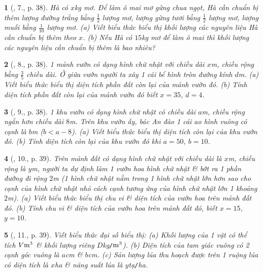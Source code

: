 \documentclass{article}
\newtheorem{baitoan}{}
\begin{document}
\begin{baitoan}[\cite{SBT_Toan_7_Canh_Dieu_tap_2}, 7., p. 38]
	Hà có $x$\emph{kg} mơ. Để làm ô mai mơ gừng chua ngọt, Hà cần chuẩn bị thêm lượng đường trắng bằng $\frac{1}{2}$ lượng mơ, lượng gừng tươi bằng $\frac{1}{2}$ lượng mơ, lượng muối bằng $\frac{1}{10}$ lượng mơ. (a) Viết biểu thức biểu thị khối lượng các nguyên liệu Hà cần chuẩn bị thêm theo $x$. (b) Nếu Hà có $15$\emph{kg} mơ để làm ô mai thì khối lượng các nguyên liệu cần chuẩn bị thêm là bao nhiêu?
\end{baitoan}

\begin{baitoan}[\cite{SBT_Toan_7_Canh_Dieu_tap_2}, 8., p. 38]
	1 mảnh vườn có dạng hình chữ nhật với chiều dài $x$\emph{m}, chiều rộng bằng $\frac{3}{5}$ chiều dài. Ở giữa vườn người ta xây 1 cái bể hình tròn đường kính $d$\emph{m}. (a) Viết biểu thức biểu thị diện tích phần đất còn lại của mảnh vườn đó. (b) Tính diện tích phần đất còn lại của mảnh vườn đó biết $x = 35$, $d = 4$.
\end{baitoan}

\begin{baitoan}[\cite{SBT_Toan_7_Canh_Dieu_tap_2}, 9., p. 38]
	1 khu vườn có dạng hình chữ nhật có chiều dài $a$\emph{m}, chiều rộng ngắn hơn chiều dài $8$\emph{m}. Trên khu vườn ấy, bác An đào 1 cái ao hình vuông có cạnh là $b$\emph{m} ($b < a - 8$). (a) Viết biểu thức biểu thị diện tích còn lại của khu vườn đó. (b) Tính diện tích còn lại của khu vườn đó khi $a = 50$, $b = 10$.
\end{baitoan}

\begin{baitoan}[\cite{SBT_Toan_7_Canh_Dieu_tap_2}, 10., p. 39]
	Trên mảnh đất có dạng hình chữ nhật với chiều dài là $x$\emph{m}, chiều rộng là $y$\emph{m}, người ta dự định làm 1 vườn hoa hình chữ nhật \& bớt ra 1 phần đường đi rộng $2$\emph{m} (1 hình chữ nhật nằm trong 1 hình chữ nhật lớn hơn sao cho cạnh của hình chữ nhật nhỏ cách cạnh tương ứng của hình chữ nhật lớn 1 khoảng $2$\emph{m}). (a) Viết biểu thức biểu thị chu vi \& diện tích của vườn hoa trên mảnh đất đó. (b) Tính chu vi \& diện tích của vườn hoa trên mảnh đất đó, biết $x = 15$, $y = 10$.
\end{baitoan}

\begin{baitoan}[\cite{SBT_Toan_7_Canh_Dieu_tap_2}, 11., p. 39]
	Viết biểu thức đại số biểu thị: (a) Khối lượng của 1 vật có thể tích $V{\rm m}^3$ \& khối lượng riêng $D$\emph{kg\texttt{/}$\rm m^3$}). (b) Diện tích của tam giác vuông có 2 cạnh góc vuông là $a$\emph{cm} \& $b$\emph{cm}. (c) Sản lượng lúa thu hoạch được trên 1 ruộng lúa có diện tích là $x$\emph{ha} \& năng suất lúa là $y$\emph{tạ\texttt{/}ha}.
\end{baitoan}
\end{document}
